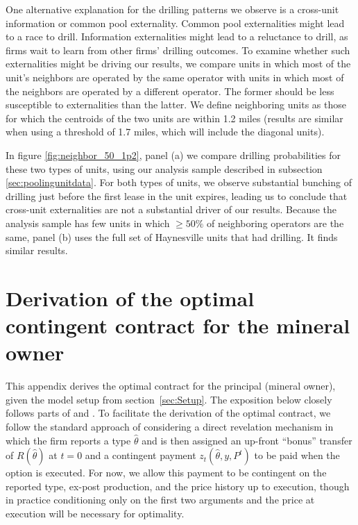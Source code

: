 \documentclass[12pt]{article}
\begin{document}
One alternative explanation for the drilling patterns we observe is a cross-unit information or common pool externality. Common pool externalities might lead to a race to drill. Information externalities might lead to a reluctance to drill, as firms wait to learn from other firms' drilling outcomes. To examine whether such externalities might be driving our results, we compare units in which most of the unit's neighbors are operated by the same operator with units in which most of the neighbors are operated by a different operator. The former should be less susceptible to externalities than the latter. We define neighboring units as those for which the centroids of the two units are within 1.2 miles (results are similar when using a threshold of 1.7 miles, which will include the diagonal units).

In figure \ref{fig:neighbor_50_1p2}, panel (a) we compare drilling probabilities for these two types of units, using our analysis sample described in subsection \ref{sec:poolingunitdata}. For both types of units, we observe substantial bunching of drilling just before the first lease in the unit expires, leading us to conclude that cross-unit externalities are not a substantial driver of our results. Because the analysis sample has few units in which $\geq50\%$ of neighboring operators are the same, panel (b) uses the full set of Haynesville units that had drilling. It finds similar results.



\section{Derivation of the optimal contingent contract for the mineral owner \label{appx:optcontract}}

This appendix derives the optimal contract for the principal (mineral owner), given the model setup from section~\ref{sec:Setup}. The exposition below closely follows parts of \citet{bib:laffonttirole1986} and \citet{bib:board}. To facilitate the derivation of the optimal contract, we follow the standard approach of considering a direct revelation mechanism in which the firm reports a type $\hat{\theta}$ and is then assigned an up-front ``bonus'' transfer of $R(\hat{\theta})$ at $t=0$ and a contingent payment $z_t(\hat{\theta},y,P^t)$ to be paid when the option is executed. For now, we allow this payment to be contingent on the reported type, ex-post production, and the price history up to execution, though in practice conditioning only on the first two arguments and the price at execution will be necessary for optimality.
\end{document}
